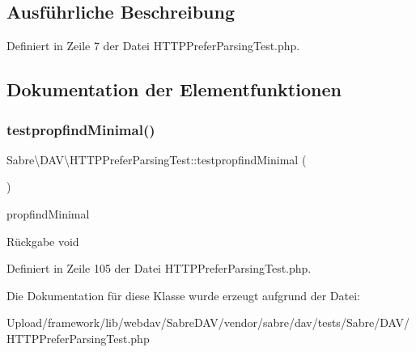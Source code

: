 \subsection{Ausführliche Beschreibung}


Definiert in Zeile 7 der Datei H\+T\+T\+P\+Prefer\+Parsing\+Test.\+php.



\subsection{Dokumentation der Elementfunktionen}
\mbox{\label{class_sabre_1_1_d_a_v_1_1_h_t_t_p_prefer_parsing_test_add84489c4d6ed3d4aa6add8261487d8c}} 
\subsubsection{\texorpdfstring{testpropfind\+Minimal()}{testpropfindMinimal()}}
{\footnotesize\ttfamily Sabre\textbackslash{}\+D\+A\+V\textbackslash{}\+H\+T\+T\+P\+Prefer\+Parsing\+Test\+::testpropfind\+Minimal (\begin{DoxyParamCaption}{ }\end{DoxyParamCaption})}

propfind\+Minimal

\begin{DoxyReturn}{Rückgabe}
void 
\end{DoxyReturn}


Definiert in Zeile 105 der Datei H\+T\+T\+P\+Prefer\+Parsing\+Test.\+php.



Die Dokumentation für diese Klasse wurde erzeugt aufgrund der Datei\+:\begin{DoxyCompactItemize}
\item 
Upload/framework/lib/webdav/\+Sabre\+D\+A\+V/vendor/sabre/dav/tests/\+Sabre/\+D\+A\+V/H\+T\+T\+P\+Prefer\+Parsing\+Test.\+php\end{DoxyCompactItemize}
